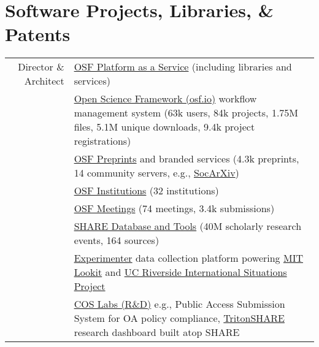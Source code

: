 \documentclass[11pt]{article}
\begin{document}
\begin{publications}
\end{publications}

\section*{Software Projects, Libraries, \& Patents}
\begin{tabularx}{\textwidth}{rX}
Director \& Architect	 & \textbullet \hspace{.25em} \href{http://github.com/CenterForOpenScience/}{OSF Platform as a Service} (including libraries and services)\\
								 & \textbullet \hspace{.25em} \href{http://osf.io}{Open Science Framework (osf.io)} workflow management system (63k users, 84k projects, 1.75M files, 5.1M unique downloads, 9.4k project registrations)\\
								 & \textbullet \hspace{.25em} \href{http://osf.io/preprints}{OSF Preprints} and branded services (4.3k preprints, 14 community servers, e.g., \href{http://osf.io/preprints/socarxiv}{SocArXiv})\\
								 & \textbullet \hspace{.25em} \href{https://cos.io/our-products/osf-institutions/}{OSF Institutions} (32 institutions)\\
								 & \textbullet \hspace{.25em} \href{https://cos.io/our-products/osf-meetings/}{OSF Meetings} (74 meetings, 3.4k submissions)\\
		                      	 & \textbullet \hspace{.25em} \href{http://share.osf.io}{SHARE Database and Tools} (40M scholarly research events, 164 sources)\\
		                      	 & \textbullet \hspace{.25em} \href{https://github.com/CenterForOpenScience/experimenter}{Experimenter} data collection platform powering \href{https://lookit.mit.edu/}{MIT Lookit} and \href{http://www.internationalsituationsproject.com/}{UC Riverside International Situations Project}\\
       			              	 & \textbullet \hspace{.25em} \href{http://github.com/cos-labs/}{COS Labs (R\&D)} e.g., Public Access Submission System for OA policy compliance, \href{http://tritonshare.ucsd.edu.com/cos-labs/}{TritonSHARE} research dashboard built atop SHARE\\

\end{tabularx}
\end{document}
